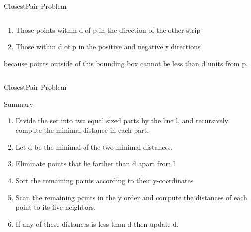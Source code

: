 \documentclass{beamer}
\begin{document}
\begin{frame}{ClosestPair Problem}
\begin{columns}[t]
\begin{column}{0.7\textwidth}
{      \begin{enumerate}
	\item Those points within d of p in the direction of the other strip
	\item Those within d of p in the positive and negative y directions
      \end{enumerate}
      because points outside of this bounding box cannot be less than d units from p.\\}
      \begin{itemize}
      \end{itemize}
    \end{column}
  \end{columns}
\end{frame}

\begin{frame}[<+->]{ClosestPair Problem}
  \begin{block}{Summary}
  \begin{enumerate}
    \item Divide the set into two equal sized parts by the line l, and recursively compute the minimal distance in each part.
    \item Let d be the minimal of the two minimal distances.
    \item Eliminate points that lie farther than d apart from l
    \item Sort the remaining points according to their y-coordinates
    \item Scan the remaining points in the y order and compute the distances of each point to its five neighbors.
    \item If any of these distances is less than d then update d.
  \end{enumerate}
  \end{block}
\end{frame}
\end{document}
